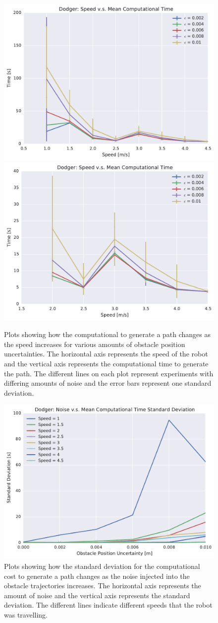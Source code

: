 \begin{figure}[h!]
    \centering
    \includegraphics[width=0.48\linewidth]{figs/planner_mean_times_1}
    \includegraphics[width=0.48\linewidth]{figs/planner_small_mean_times_1}

    \caption{Plots showing how the computational to generate a path changes as
        the speed increases for various amounts of obstacle position
        uncertainties.  The horizontal axis represents the speed of the robot
        and the vertical axis represents the computational time to generate the
        path. The different lines on each plot represent experiments with
        differing amounts of noise and the error bars represent one standard
        deviation.}

\end{figure}

\begin{figure}[h!]
    \centering

    \includegraphics[width=0.80\linewidth]{figs/planner_std_avg_times_1}

    \caption{Plots showing how the standard deviation for the computational
        cost to generate a path changes as the noise injected into the obstacle
        trajectories increases.  The horizontal axis represents the amount of
        noise and the vertical axis represents the standard deviation. The
    different lines indicate different speeds that the robot was travelling.}

\end{figure}

